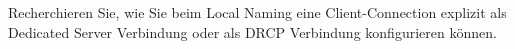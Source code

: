     \item Recherchieren Sie, wie Sie beim Local Naming eine Client-Connection explizit als Dedicated Server Verbindung oder als DRCP Verbindung konfigurieren k\"onnen.
